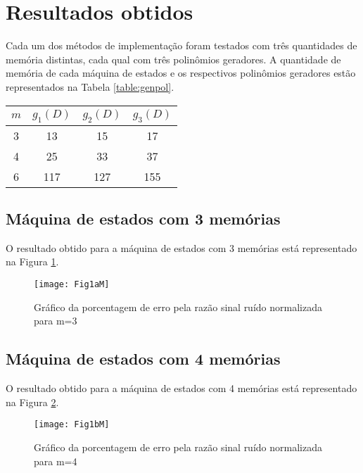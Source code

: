 \section{Resultados obtidos}

Cada um dos métodos de implementação foram testados com três quantidades de memória distintas, cada qual com três polinômios geradores. A quantidade de memória de cada máquina de estados e os respectivos polinômios geradores estão representados na Tabela \ref{table:genpol}.

\begin{table}[H]
	\centering
	\captionsetup{font=scriptsize}
	\begin{tabular}{c|ccc}
		\textbf{$m$} & \textbf{$g_{1}(D)$} & \textbf{$g_{2}(D)$} & \textbf{$g_{3}(D)$} \\ \hline
		3 & 13 & 15 & 17 \\
		4 & 25 & 33 & 37 \\
		6 & 117 & 127 & 155
	\end{tabular}
\end{table}

\subsection{Máquina de estados com 3 memórias}

O resultado obtido para a máquina de estados com 3 memórias está representado na Figura \ref{fig:Fig1aM}.

\begin{figure}[H]
\centering
\texttt{[image: Fig1aM]}
\captionsetup{font=scriptsize}
\caption{Gráfico da porcentagem de erro pela razão sinal ruído normalizada para m=3\label{fig:Fig1aM}}
\end{figure}

\subsection{Máquina de estados com 4 memórias}

O resultado obtido para a máquina de estados com 4 memórias está representado na Figura \ref{fig:Fig1bM}.

\begin{figure}[H]
	\centering
	\texttt{[image: Fig1bM]}
	\captionsetup{font=scriptsize}
	\caption{Gráfico da porcentagem de erro pela razão sinal ruído normalizada para m=4\label{fig:Fig1bM}}
\end{figure}

